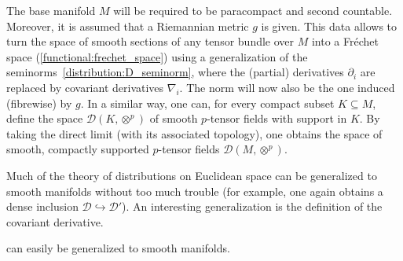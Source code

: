     The base manifold $M$ will be required to be paracompact and second countable. Moreover, it is assumed that a Riemannian metric $g$ is given. This data allows to turn the space of smooth sections of any tensor bundle over $M$ into a Fr\'echet space (\cref{functional:frechet_space}) using a generalization of the seminorms~\eqref{distribution:D_seminorm}, where the (partial) derivatives $\partial_i$ are replaced by covariant derivatives $\nabla_i$. The norm will now also be the one induced (fibrewise) by $g$. In a similar way, one can, for every compact subset $K\subseteq M$, define the space $\mathcal{D}(K,\otimes^p)$ of smooth $p$-tensor fields with support in $K$. By taking the direct limit (with its associated topology), one obtains the space of smooth, compactly supported $p$-tensor fields $\mathcal{D}(M,\otimes^p)$.


    Much of the theory of distributions on Euclidean space can be generalized to smooth manifolds without too much trouble (for example, one again obtains a dense inclusion $\mathcal{D}\hookrightarrow\mathcal{D}'$). An interesting generalization is the definition of the covariant derivative.

     can easily be generalized to smooth manifolds.
